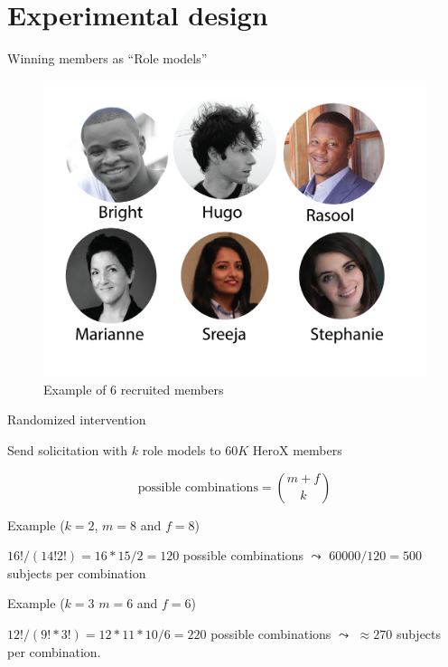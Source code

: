 \section{Experimental design}\label{experimental-design}

\begin{frame}{Winning members as ``Role models''}

\begin{figure}
\centering
\includegraphics{herox_headshots-01.png}
\caption{Example of 6 recruited members}
\end{figure}

\end{frame}

\begin{frame}{Randomized intervention}

Send solicitation with \(k\) role models to \(60K\) HeroX members

\[
    \text{possible combinations} = \binom{m + f}{k} 
\]

\begin{block}{Example (\(k=2\), \(m=8\) and \(f=8\))}

\(16! / (14! 2!) = 16 * 15 / 2 = 120\) possible combinations
\(\leadsto\) \(60000/120=500\) subjects per combination

\end{block}

\begin{block}{Example (\(k=3\) \(m=6\) and \(f=6\))}

\(12! / (9! * 3!) = 12 * 11 * 10 / 6 = 220\) possible combinations
\(\leadsto\) \(\approx 270\) subjects per combination.

\end{block}

\end{frame}

